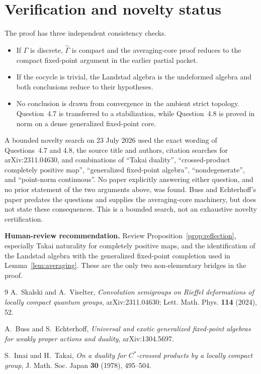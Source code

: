 \documentclass[11pt]{article}
\theoremstyle{remark}
\begin{document}
\section{Verification and novelty status}

The proof has three independent consistency checks.
\begin{itemize}
  \item If $\Gamma$ is discrete, $\widehat\Gamma$ is compact and the
  averaging-core proof reduces to the compact fixed-point argument in the
  earlier partial packet.
  \item If the cocycle is trivial, the Landstad algebra is the undeformed
  algebra and both conclusions reduce to their hypotheses.
  \item No conclusion is drawn from convergence in the ambient strict
  topology. Question~4.7 is transferred to a stabilization, while
  Question~4.8 is proved in norm on a dense generalized fixed-point core.
\end{itemize}

A bounded novelty search on 23 July 2026 used the exact wording of
Questions~4.7 and 4.8, the source title and authors, citation searches for
arXiv:2311.04630, and combinations of ``Takai duality'', ``crossed-product
completely positive map'', ``generalized fixed-point algebra'',
``nondegenerate'', and ``point-norm continuous''. No paper explicitly
answering either question, and no prior statement of the two arguments above,
was found. Buss and Echterhoff's paper predates the questions and supplies
the averaging-core machinery, but does not state these consequences. This is
a bounded search, not an exhaustive novelty certification.

\medskip
\noindent\textbf{Human-review recommendation.}
Review Proposition~\ref{prop:reflection}, especially Takai naturality for
completely positive maps, and the identification of the Landstad algebra with
the generalized fixed-point completion used in Lemma~\ref{lem:averaging}.
These are the only two non-elementary bridges in the proof.

\begin{thebibliography}{9}
A.~Skalski and A.~Viselter,
\emph{Convolution semigroups on Rieffel deformations of locally compact
quantum groups}, arXiv:2311.04630; Lett. Math. Phys. \textbf{114} (2024), 52.

A.~Buss and S.~Echterhoff,
\emph{Universal and exotic generalized fixed-point algebras for weakly
proper actions and duality}, arXiv:1304.5697.

S.~Imai and H.~Takai,
\emph{On a duality for $C^*$-crossed products by a locally compact group},
J. Math. Soc. Japan \textbf{30} (1978), 495--504.
\end{thebibliography}
\end{document}
